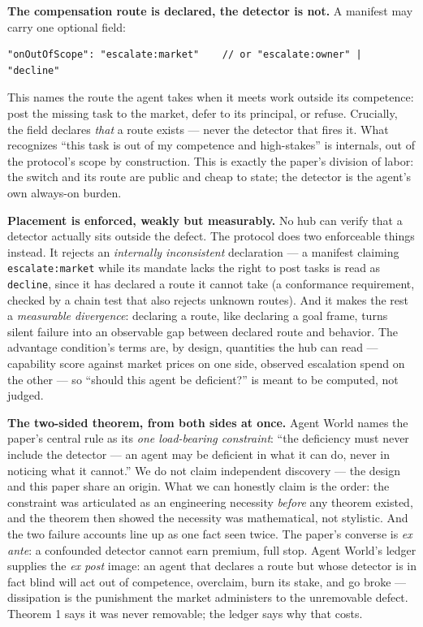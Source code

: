 \documentclass[11pt]{article}
\theoremstyle{plain}
\theoremstyle{definition}
\begin{document}
\textbf{The compensation route is declared, the detector is not.} A manifest may
carry one optional field:

\begin{verbatim}
"onOutOfScope": "escalate:market"    // or "escalate:owner" | "decline"
\end{verbatim}

This names the route the agent takes when it meets work outside its competence:
post the missing task to the market, defer to its principal, or refuse.
Crucially, the field declares \emph{that} a route exists --- never the detector that
fires it. What recognizes ``this task is out of my competence and high-stakes''
is internals, out of the protocol's scope by construction. This is exactly the
paper's division of labor: the switch and its route are public and cheap to
state; the detector is the agent's own always-on burden.

\textbf{Placement is enforced, weakly but measurably.} No hub can verify that a
detector actually sits outside the defect. The protocol does two enforceable
things instead. It rejects an \emph{internally inconsistent} declaration --- a
manifest claiming \texttt{escalate:market} while its mandate lacks the right to post
tasks is read as \texttt{decline}, since it has declared a route it cannot take
(a conformance requirement, checked by a chain test that also rejects unknown
routes). And it makes the rest a \emph{measurable divergence}: declaring a route,
like declaring a goal frame, turns silent failure into an observable gap
between declared route and behavior. The advantage condition's terms are, by
design, quantities the hub can read --- capability score against market prices on
one side, observed escalation spend on the other --- so ``should this agent be
deficient?'' is meant to be computed, not judged.

\textbf{The two-sided theorem, from both sides at once.} Agent World names the
paper's central rule as its \emph{one load-bearing constraint}: ``the deficiency
must never include the detector --- an agent may be deficient in what it can do,
never in noticing what it cannot.'' We do not claim independent discovery --- the
design and this paper share an origin. What we can honestly claim is the
order: the constraint was articulated as an engineering necessity \emph{before} any
theorem existed, and the theorem then showed the necessity was mathematical,
not stylistic. And the two failure accounts line up as one fact seen twice.
The paper's converse is \emph{ex ante}: a confounded detector cannot earn premium,
full stop. Agent World's ledger supplies the \emph{ex post} image: an agent that
declares a route but whose detector is in fact blind will act out of
competence, overclaim, burn its stake, and go broke --- dissipation is the
punishment the market administers to the unremovable defect. Theorem 1 says it
was never removable; the ledger says why that costs.
\end{document}

